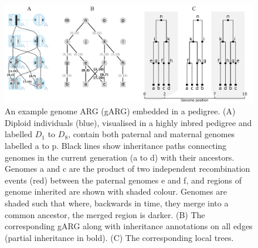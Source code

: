 \documentclass{article}
\newcommand{\noderef}[1]{\textsf{#1}}
\begin{document}
\begin{figure}
\begin{center}
    \includegraphics[width=\textwidth]{illustrations/arg-in-pedigree}
\end{center}
\caption{\label{fig-arg-in-pedigree}
An example genome ARG (gARG) embedded in a pedigree.
(A) Diploid individuals (blue), visualised in a highly inbred pedigree and
labelled $D_1$ to $D_8$,
contain both paternal and maternal  genomes
labelled \noderef{a} to \noderef{p}. Black lines show inheritance paths connecting
genomes in the current generation (\noderef{a} to \noderef{d}) with their ancestors.
Genomes \noderef{a} and \noderef{c} are the product of two independent
recombination events (red) between
the paternal genomes \noderef{e}
and \noderef{f}, and regions of genome inherited are shown with shaded colour.
Genomes are shaded such that where, backwards in time,
they merge into a common ancestor, the merged region is darker.
(B) The corresponding gARG along with inheritance annotations on all edges
(partial inheritance in bold).
(C) The corresponding local trees.
}
\end{figure}
\end{document}
